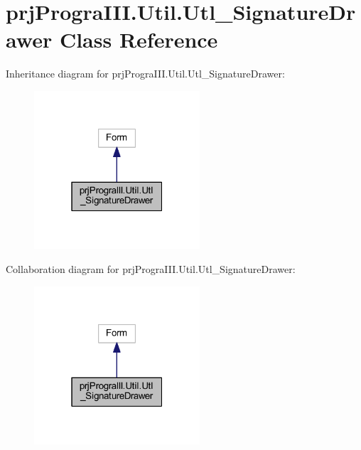 \hypertarget{classprj_progra_i_i_i_1_1_util_1_1_utl___signature_drawer}{}\section{prj\+Progra\+I\+I\+I.\+Util.\+Utl\+\_\+\+Signature\+Drawer Class Reference}
\label{classprj_progra_i_i_i_1_1_util_1_1_utl___signature_drawer}


Inheritance diagram for prj\+Progra\+I\+I\+I.\+Util.\+Utl\+\_\+\+Signature\+Drawer\+:
\nopagebreak
\begin{figure}[H]
\begin{center}
\leavevmode
\includegraphics[width=175pt]{classprj_progra_i_i_i_1_1_util_1_1_utl___signature_drawer__inherit__graph}
\end{center}
\end{figure}


Collaboration diagram for prj\+Progra\+I\+I\+I.\+Util.\+Utl\+\_\+\+Signature\+Drawer\+:
\nopagebreak
\begin{figure}[H]
\begin{center}
\leavevmode
\includegraphics[width=175pt]{classprj_progra_i_i_i_1_1_util_1_1_utl___signature_drawer__coll__graph}
\end{center}
\end{figure}
